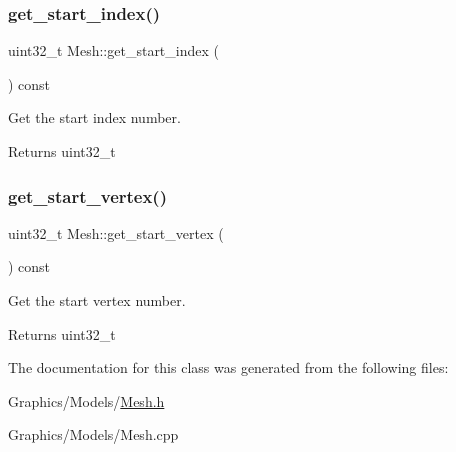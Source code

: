 \subsubsection{\texorpdfstring{get\+\_\+start\+\_\+index()}{get\_start\_index()}}
{\footnotesize\ttfamily uint32\+\_\+t Mesh\+::get\+\_\+start\+\_\+index (\begin{DoxyParamCaption}{ }\end{DoxyParamCaption}) const}



Get the start index number. 

\begin{DoxyReturn}{Returns}
uint32\+\_\+t 
\end{DoxyReturn}
\mbox{\label{classMesh_a203b83303bf3419d2c82a8078a876bee}} 
\subsubsection{\texorpdfstring{get\+\_\+start\+\_\+vertex()}{get\_start\_vertex()}}
{\footnotesize\ttfamily uint32\+\_\+t Mesh\+::get\+\_\+start\+\_\+vertex (\begin{DoxyParamCaption}{ }\end{DoxyParamCaption}) const}



Get the start vertex number. 

\begin{DoxyReturn}{Returns}
uint32\+\_\+t 
\end{DoxyReturn}


The documentation for this class was generated from the following files\+:\begin{DoxyCompactItemize}
\item 
Graphics/\+Models/\hyperlink{Mesh_8h}{Mesh.\+h}\item 
Graphics/\+Models/Mesh.\+cpp\end{DoxyCompactItemize}

